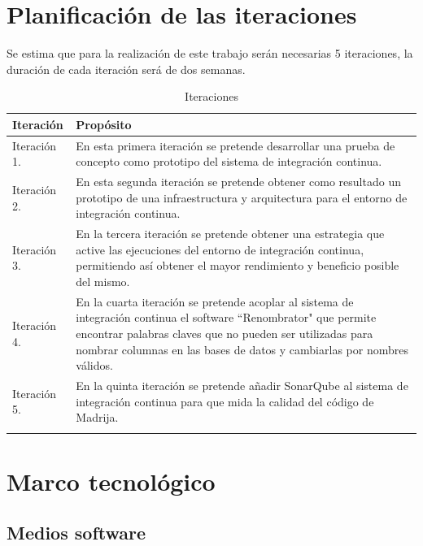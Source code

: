 \newpage

\section{Planificación de las iteraciones}

Se estima que para la realización de este trabajo serán necesarias 5 iteraciones, la duración de cada iteración será de dos semanas.

\begin{center}
\begin{longtable}{p{} p{}}
\hline \hline
  \textbf{Iteración} & \textbf{Propósito} \\
    \hline \hline
    Iteración 1. & En esta primera iteración se pretende desarrollar una prueba de concepto como prototipo del sistema de integración continua.\\
    \hline\hline
    Iteración 2. & En esta segunda iteración se pretende obtener como resultado un prototipo de una infraestructura y arquitectura para el entorno de integración continua.\\
    \hline \hline
    Iteración 3. & En la tercera iteración se pretende obtener una estrategia que active las ejecuciones del entorno de integración continua, permitiendo así obtener el mayor rendimiento y beneficio posible del mismo.\\
    \hline \hline
    Iteración 4. & En la cuarta iteración se pretende acoplar al sistema de integración continua el software ``Renombrator" que permite encontrar palabras claves que no pueden ser utilizadas para nombrar columnas en las bases de datos y cambiarlas por nombres válidos.\\
    \hline \hline
    Iteración 5. & En la quinta iteración se pretende añadir SonarQube al sistema de integración continua para que mida la calidad del código de \ac{Madrija}.\\
    \hline \hline
    \rowcolor{white}\caption{Iteraciones}
\end{longtable}
\end{center}

\newpage

\section{Marco tecnológico}
\subsection{Medios software}

